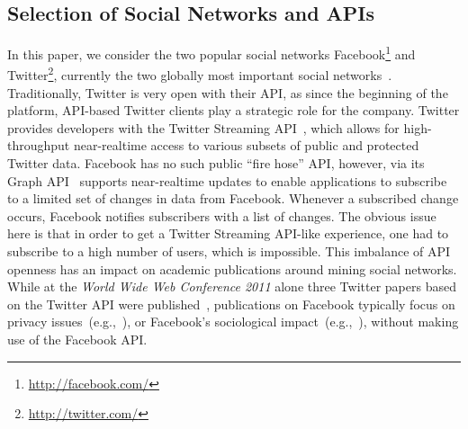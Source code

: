 \documentclass{iosart2c}
\begin{document}
\subsection{Selection of Social Networks and APIs}
In this paper, we consider the two popular social networks Facebook\footnote{\url{http://facebook.com/}} and Twitter\footnote{\url{http://twitter.com/}}, currently the two globally most important social networks~\cite{comScoreTwitter, comScoreFacebook}.
Traditionally, Twitter is very open with their API, as since the beginning of the platform, API-based Twitter clients  play a strategic role for the company.
Twitter provides developers with the Twitter Streaming API~\cite{TwitterStreamingAPI}, which allows for high-throughput near-realtime access to various subsets of public and protected Twitter data.
Facebook has no such public ``fire hose'' API, however, via its Graph API~\cite{FacebookRealtimeAPI} supports near-realtime updates to enable applications to subscribe to a limited set of changes in data from Facebook.
Whenever a subscribed change occurs, Facebook notifies subscribers with a list of changes.
The obvious issue here is that in order to get a Twitter Streaming API-like experience, one had to subscribe to a high number of users, which is impossible.
This imbalance of API openness has an impact on academic publications around mining social networks.
While at the \textit{World Wide Web Conference 2011} alone three Twitter papers based on the Twitter API were published~\cite{Meeder:2011:WKY:1963405.1963479, Romero:2011:DMI:1963405.1963503, Wu:2011:SWT:1963405.1963504}, publications on Facebook typically focus on privacy issues~(e.g.,~\cite{liu:settings}), or Facebook's sociological impact~(e.g.,~\cite{JCC4:JCC4367}), without making use of the Facebook API.
\end{document}

